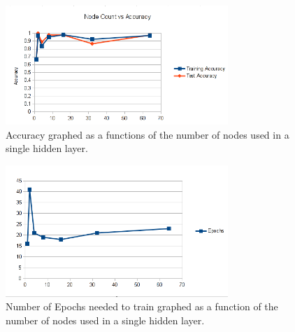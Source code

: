 \documentclass[12pt]{article}
\begin{document}
\begin{figure}[!ht]
    \begin{center}
        \includegraphics[width=0.75\textwidth]{Iris-NodeCount-Accuracy}
    \end{center}
    \caption{Accuracy graphed as a functions of the number of nodes used in a
    single hidden layer.}
  \label{fig:node_count_accuracy}
\end{figure}
\begin{figure}[!ht]
    \begin{center}
        \includegraphics[width=0.75\textwidth]{Iris-NodeCount-Epochs}
    \end{center}
    \caption{Number of Epochs needed to train graphed as a function of the
    number of nodes used in a single hidden layer.}
  \label{fig:node_count_epochs}
\end{figure}
\end{document}
